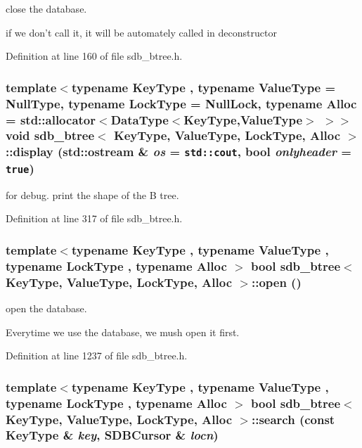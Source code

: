 close the database. 

if we don't call it, it will be automately called in deconstructor 

Definition at line 160 of file sdb\_\-btree.h.\hypertarget{classsdb__btree_b1f5ad2d92b57af57aca4a06c925bb16}{
\subsubsection[{display}]{\setlength{\rightskip}{0pt plus 5cm}template$<$typename KeyType , typename ValueType  = NullType, typename LockType  = NullLock, typename Alloc  = std::allocator$<$DataType$<$KeyType,ValueType$>$ $>$$>$ void {\bf sdb\_\-btree}$<$ KeyType, ValueType, LockType, Alloc $>$::display (std::ostream \& {\em os} = {\tt std::cout}, \/  bool {\em onlyheader} = {\tt true})}}
\label{classsdb__btree_b1f5ad2d92b57af57aca4a06c925bb16}


for debug. print the shape of the B tree. 

Definition at line 317 of file sdb\_\-btree.h.\hypertarget{classsdb__btree_3930f68c0075a965d79dae75586e611d}{
\subsubsection[{open}]{\setlength{\rightskip}{0pt plus 5cm}template$<$typename KeyType , typename ValueType , typename LockType , typename Alloc $>$ bool {\bf sdb\_\-btree}$<$ KeyType, ValueType, LockType, Alloc $>$::open ()}}
\label{classsdb__btree_3930f68c0075a965d79dae75586e611d}


open the database. 

Everytime we use the database, we mush open it first. 

Definition at line 1237 of file sdb\_\-btree.h.\hypertarget{classsdb__btree_2761e4efefbe470ca5121c2eb19f6a6e}{
\subsubsection[{search}]{\setlength{\rightskip}{0pt plus 5cm}template$<$typename KeyType , typename ValueType , typename LockType , typename Alloc $>$ bool {\bf sdb\_\-btree}$<$ KeyType, ValueType, LockType, Alloc $>$::search (const KeyType \& {\em key}, \/  SDBCursor \& {\em locn})}}
\label{classsdb__btree_2761e4efefbe470ca5121c2eb19f6a6e}


